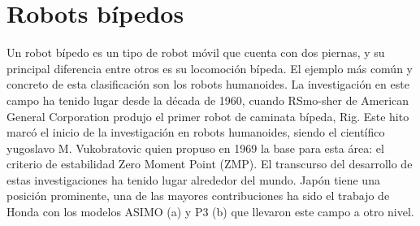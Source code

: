 \section{Robots bípedos}
Un robot bípedo es un tipo de robot móvil que cuenta con dos piernas, y su principal diferencia entre otros es su locomoción bípeda. \cite{yang2017stateart} El ejemplo más común y concreto de esta clasificación son los robots humanoides. La investigación en este campo ha tenido lugar desde la década de 1960, cuando RSmo-sher de American General Corporation produjo el primer robot de caminata bípeda, Rig. Este hito marcó el inicio de la investigación en robots humanoides, siendo el científico yugoslavo M. Vukobratovic quien propuso en 1969 la base para esta área: el criterio de estabilidad Zero Moment Point (ZMP).\cite{chen2013walking}
El transcurso del desarrollo de estas investigaciones ha tenido lugar alrededor del mundo. Japón tiene una posición prominente, una de las mayores contribuciones ha sido el trabajo de Honda con los modelos ASIMO (a) y P3 (b) que llevaron este campo a otro nivel.\cite{chen2013walking}
